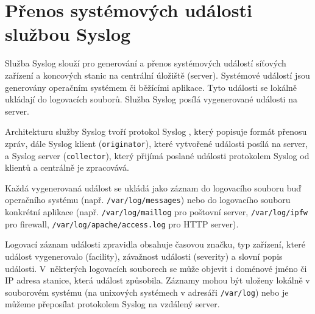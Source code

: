 \section{Přenos systémových události službou Syslog}\label{syslog}
Služba Syslog  slouží pro generování a přenos systémových událostí síťových zařízení a koncových stanic na centrální úložiště (server). Systémové událostí jsou generovány operačním systémem či běžícími aplikace. Tyto události se lokálně ukládají do logovacích souborů. Služba Syslog posílá vygenerované události na server. 

Architekturu služby Syslog tvoří protokol Syslog \cite{rfc5424}, který popisuje formát přenosu zpráv, dále Syslog klient ({\tt originator}), které vytvořené události posílá na server, a Syslog server ({\tt collector}), který přijímá poslané události protokolem Syslog od klientů a centrálně je zpracovává. 

Každá vygenerovaná událost se ukládá jako záznam do logovacího souboru buď operačního systému (např. \verb|/var/log/messages|) nebo do logovacího souboru konkrétní aplikace (např. \verb|/var/log/maillog| pro poštovní server, \verb|/var/log/ipfw| pro firewall, \verb|/var/log/apache/access.log| pro HTTP server).  

Logovací záznam události zpravidla obsahuje časovou značku, typ zařízení, které událost vygenerovalo (facility), závažnost události (severity) a slovní popis události. V~některých logovacích souborech se může objevit i doménové jméno či IP adresa stanice, která událost způsobila. Záznamy mohou být uloženy lokálně v souborovém systému (na unixových systémech v adresáři \verb|/var/log|) nebo je můžeme přeposílat protokolem Syslog na vzdálený server. 

